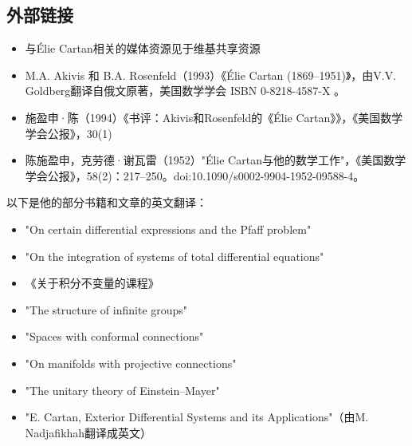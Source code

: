 \subsection{外部链接}  
\begin{itemize}
\item 与Élie Cartan相关的媒体资源见于维基共享资源  
\item M.A. Akivis 和 B.A. Rosenfeld（1993）《Élie Cartan (1869–1951)》，由V.V. Goldberg翻译自俄文原著，美国数学学会 ISBN 0-8218-4587-X 。  
\item 施盈申·陈（1994）《书评：Akivis和Rosenfeld的《Élie Cartan》》，《美国数学学会公报》，30(1)  
\item 陈施盈申，克劳德·谢瓦雷（1952）"Élie Cartan与他的数学工作"，《美国数学学会公报》，58(2)：217–250。doi:10.1090/s0002-9904-1952-09588-4。 
\end{itemize} 
以下是他的部分书籍和文章的英文翻译：  
\begin{itemize}
\item "On certain differential expressions and the Pfaff problem"  
\item "On the integration of systems of total differential equations"  
\item 《关于积分不变量的课程》  
\item "The structure of infinite groups"  
\item "Spaces with conformal connections"  
\item "On manifolds with projective connections"  
\item "The unitary theory of Einstein–Mayer"  
\item "E. Cartan, Exterior Differential Systems and its Applications"（由M. Nadjafikhah翻译成英文）
\end{itemize}